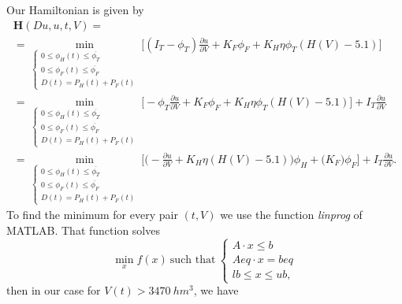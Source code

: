 \documentclass[12pt]{article}
\theoremstyle{definition}
\theoremstyle{remark}
\begin{document}
Our Hamiltonian is given by
\begin{multline*}
\mathbf{H}(Du,u,t,V)=\\
=\min_{\begin{cases}
0\leq\phi_H(t)\leq\overline{\phi_T}\\
0\leq\phi_F(t)\leq\overline{\phi_F}\\
D(t)=P_H(t)+P_F(t)
\end{cases}}\Bigg[(I_T-\phi_T)\frac{\partial u}{\partial V}+K_F\phi_F+K_H\eta\phi_T(H(V)-5.1)\Bigg]\\
=\min_{\begin{cases}
0\leq\phi_H(t)\leq\overline{\phi_T}\\
0\leq\phi_F(t)\leq\overline{\phi_F}\\
D(t)=P_H(t)+P_F(t)
\end{cases}}\Bigg[-\phi_T\frac{\partial u}{\partial V}+K_F\phi_F+K_H\eta\phi_T(H(V)-5.1)\Bigg]+I_T\frac{\partial u}{\partial V}\\
=\min_{\begin{cases}
0\leq\phi_H(t)\leq\overline{\phi_T}\\
0\leq\phi_F(t)\leq\overline{\phi_F}\\
D(t)=P_H(t)+P_F(t)
\end{cases}}\Bigg[\Big(-\frac{\partial u}{\partial V}+K_H\eta(H(V)-5.1)\Big)\phi_H+\Big(K_F\Big)\phi_F\Bigg]+I_T\frac{\partial u}{\partial V}.
\end{multline*}
To find the minimum for every pair $(t,V)$ we use the function \textit{linprog} of MATLAB. That function solves
\begin{equation*}
\min_xf(x)\ \text{such that}\ \begin{cases}
A\cdot x\leq b\\
Aeq\cdot x=beq\\
lb\leq x\leq ub,
\end{cases}
\end{equation*}
then in our case for $V(t)>3470\ hm^3$, we have
\end{document}
